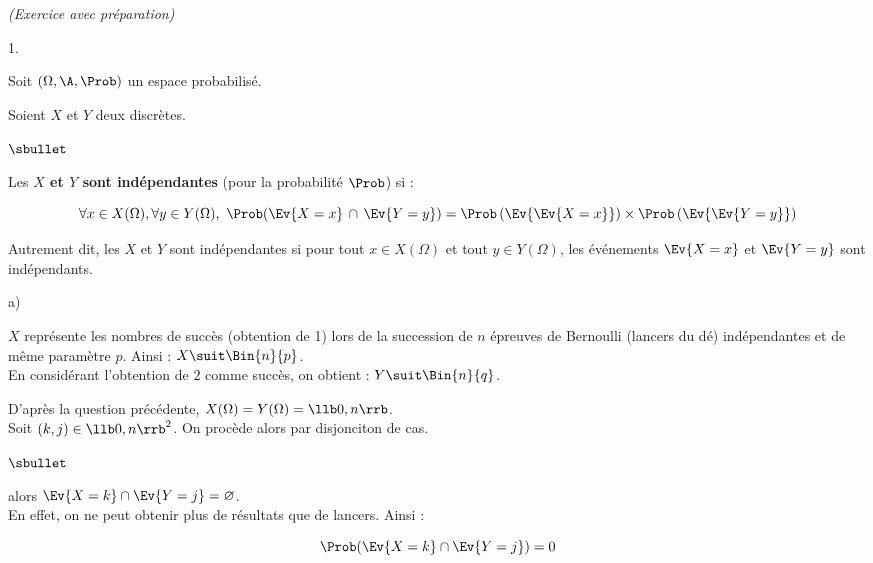 \documentclass[11pt]{article}%
\begin{document}
\newpage


\begin{exercice}{\it (Exercice avec préparation)}~
 \begin{noliste}{1.}
 \setlength{\itemsep}{4mm}
 \item 
 \begin{noliste}{}
 \item Soit $(\Omega, \A, \Prob)$ un espace probabilisé.
 \item Soient $X$ et $Y$ deux \var discrètes.
 \end{noliste}
 \begin{noliste}{$\sbullet$}
 \item Les {\bf \var $X$ et $Y$ sont indépendantes} (pour la
 probabilité $\Prob$) si :
 
\[
 \forall x \in X(\Omega), \forall y \in Y(\Omega), \ \Prob(\Ev{X
 = x} \, \cap \, \Ev{Y = y}) = \Prob\left(\Ev{\Ev{X = x}}\right) \times
 \Prob\left(\Ev{\Ev{Y = y}}\right)
\]
 \item Autrement dit, les \var $X$ et $Y$ sont indépendantes si pour
 tout $x \in X(\Omega)$ et tout $y \in Y(\Omega)$, les événements
 $\Ev{X = x}$ et $\Ev{Y = y}$ sont indépendants.
 \end{noliste}
 
 \item 
 \begin{noliste}{a)}
 \setlength{\itemsep}{2mm}
 \item $X$ représente les nombres de succès (obtention de 1) lors
 de la succession de $n$ épreuves de Bernoulli (lancers du dé)
 indépendantes et de même paramètre $p$. Ainsi : $X \suit
 \Bin{n}{p}$.\\
 En considérant l'obtention de $2$ comme succès, on obtient : $Y
 \suit \Bin{n}{q}$.
 
 \item D'après la question précédente, $X(\Omega) = Y (\Omega) = 
 \llb 0, n \rrb$.\\
 Soit $(k, j) \in \llb 0, n \rrb^{2}$. On procède alors par
 disjonciton de cas.
 \begin{noliste}{$\sbullet$}
 \item {} alors $\Ev{X = k} \cap \Ev{Y = j} = 
 \varnothing$.\\
 En effet, on ne peut obtenir plus de résultats que de
 lancers. Ainsi :
 
\[
 \Prob(\Ev{X = k} \cap \Ev{Y = j}) = 0
\]
 

\end{noliste}
\end{noliste}
\end{noliste}
\end{exercice}
\end{document}

